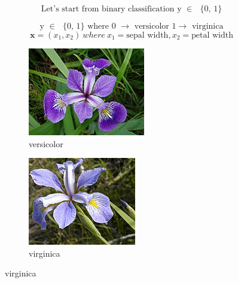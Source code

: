 \begin{frame}
\frametitle{}
\[\text{Let's start from binary classification y $\in $ $\{$0, 1$\}$}\]

\[\text{y $\in $ $\{$0, 1$\}$   where 0 $\to $ versicolor 1$\to $ virginica}\]
\[	
	\mathbf{x} = (x_ 1, x_ 2) \
		where \ x_1 = \text{sepal width}, x_2 = \text{petal width}\]
		
\begin{figure}
\begin{subfigure}{.4\textwidth}
  \centering
  \includegraphics[scale=.5]{graphics/versicolor}
  \caption{versicolor}
  \label{fig:sub1}
\end{subfigure}
% 
\begin{subfigure}{.4\textwidth}
  \centering
  \includegraphics[scale=.5]{graphics/virginica}
  \caption{virginica}
  \label{fig:sub2}
\end{subfigure}
\label{fig:test}
\end{figure}
\end{frame}
